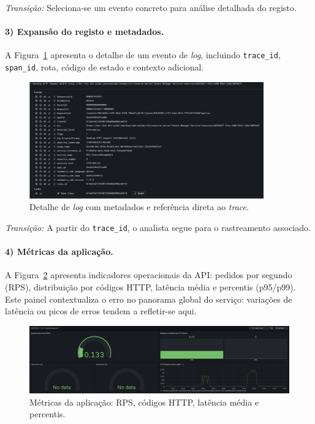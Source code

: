 \textit{Transição:} Seleciona-se um evento concreto para análise detalhada do registo.

\paragraph{3) Expansão do registo e metadados.}

A Figura~\ref{fig:dash-3} apresenta o detalhe de um evento de \textit{log}, incluindo
\texttt{trace\_id}, \texttt{span\_id}, rota, código de estado e contexto adicional.

\begin{figure}[H]
    \centering
    \includegraphics[width=0.9\textwidth]{images/Grafana/log_expanded.png}
    \caption{Detalhe de \textit{log} com metadados e referência direta ao \textit{trace}.}
    \label{fig:dash-3}
\end{figure}

\textit{Transição:} A partir do \texttt{trace\_id}, o analista segue para o rastreamento associado.

\paragraph{4) Métricas da aplicação.}

A Figura~\ref{fig:dash-4} apresenta indicadores operacionais da API: pedidos por segundo (RPS), distribuição por códigos HTTP, latência média e percentis (p95/p99). Este painel contextualiza o erro no panorama global do serviço: variações de latência ou picos de erros tendem a refletir-se aqui.

\begin{figure}[H]
    \centering
    \includegraphics[width=\textwidth]{images/Grafana/metrics_dashboard.png}
    \caption{Métricas da aplicação: RPS, códigos HTTP, latência média e percentis.}
    \label{fig:dash-4}
\end{figure}

